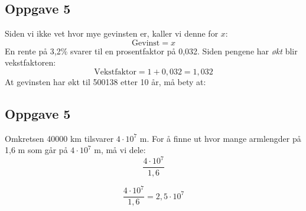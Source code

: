 \subsection{Oppgave 5}
Siden vi ikke vet hvor mye gevinsten er, kaller vi denne for $ x $:
\[ \text{Gevinst}=x \]
En rente på 3,2\% svarer til en prosentfaktor på 0,032. Siden pengene har \textit{økt} blir vekstfaktoren:
\[ \text{Vekstfaktor}=1+0,032=1,032\] 
At gevinsten har økt til 500138 etter 10 år, må bety at:

\subsection{Oppgave 5}
Omkretsen 40000 km tilsvarer $ 4\cdot10^7 $ m. For å finne ut hvor mange armlengder på 1,6 m som går på $ 4\cdot10^7 $ m, må vi dele:
\[ \frac{4\cdot10^7}{1,6} \]

\[ \frac{4\cdot10^7}{1,6} 	= 2,5\cdot10^7 \]



